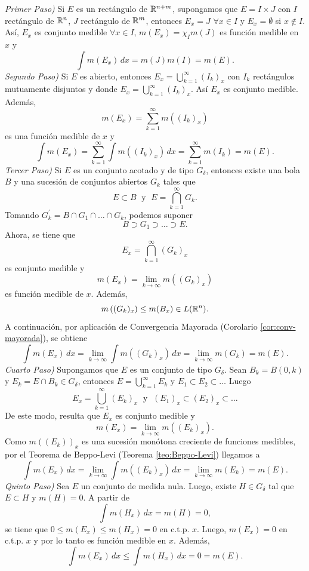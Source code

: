         \begin{demo}
        \emph{Primer Paso)} Si $E$ es un rectángulo de $\mathbb{R}^{n+m}$, supongamos que $E=I\times J$ con $I$ rectángulo de $\mathbb{R}^n$, $J$ rectángulo de $\mathbb{R}^m$, entonces $E_x=J$ $\forall x \in I$ y $E_x=\emptyset$ si $x \notin I$.
        As\'i, $E_x$ es conjunto medible $\forall x \in I$, $m(E_x)=\chi_I m(J)$ es funci\'on medible  en $x$ y 
        \[
        \int m(E_x)\,dx=m(J)m(I)=m(E).
        \]
        \emph{Segundo Paso)} Si $E$ es abierto, entonces $E_x=\bigcup\limits_{k=1}^{\infty} (I_k)_x$ con $I_k$ rectángulos mutuamente disjuntos y donde $E_x=\bigcup\limits_{k=1}^{\infty} \left(I_k\right)_x$. 
        As\'i $E_x$ es conjunto medible. Adem\'as, 
        \[
        m(E_x)=\sum\limits_{k=1}^{\infty} m\left((I_k)_x\right)
        \]
        es una funci\'on medible de $x$ y 
        \[
        \int m(E_x)=\sum\limits_{k=1}^{\infty} \int m\left((I_k)_x\right)\,dx=
        \sum\limits_{k=1}^{\infty} m(I_k)=m(E).
        \]
        \emph{Tercer Paso)} Si $E$ es un conjunto acotado y de tipo $G_{\delta}$, entonces existe una bola $B$ y una sucesi\'on de conjuntos abiertos $G_k$ tales que 
        \[
        E\subset B\;\mbox{  y   }\;E=\bigcap\limits_{k=1}^{\infty}G_k.
        \]
        Tomando $G_k^{'}=B\cap G_1\cap \ldots \cap G_k$, podemos suponer
        \[B\supset G_1 \supset \ldots \supset E.\]
        Ahora, se tiene que 
        \[
        E_x=\bigcap\limits_{k=1}^{\infty} \left(G_k\right)_x
        \]
        es conjunto medible y 
        \[
        m(E_x)=\lim\limits_{k \to \infty} m\left((G_k)_x\right)
        \]
        es funci\'on medible de $x$. Adem\'as, 
        \[
        m\left((G_k)_x\right)\leq m(B_x)\in L(\mathbb{R}^n).
        \]
        A continuaci\'on, por aplicaci\'on de Convergencia Mayorada (Corolario \ref{cor:conv-mayorada}), se obtiene 
        \[
        \int m(E_x)\,dx =\lim\limits_{k \to \infty} \int m\left((G_k)_x\right)\,dx =\lim\limits_{k \to \infty} m(G_k)=m(E).
        \]
        \emph{Cuarto Paso)}
        Supongamos que  $E$ es un conjunto de tipo $G_{\delta}$. 
        Sean $B_k=B(0,k)$ y $E_k=E\cap B_k \in G_{\delta}$, entonces $E=\bigcup\limits_{k=1}^{\infty} E_k$ y $E_1\subset E_2\subset \ldots$ Luego
        \[
        E_x=\bigcup\limits_{k=1}^{\infty} \left(E_k\right)_x
        \;\mbox{ y }\;
        (E_1)_x \subset (E_2)_x \subset \ldots
        \]
        De este modo, resulta que $E_x$ es conjunto medible y 
        \[m(E_x) = \lim\limits_{k \to \infty} m((E_k)_x).\]
                Como $m((E_k))_x$ es una sucesi\'on mon\'otona creciente de funciones medibles, por el Teorema de Beppo-Levi (Teorema \ref{teo:Beppo-Levi}) llegamos a 
     \[\int m(E_x)\,dx=\lim\limits_{k \to \infty} \int m\left(\left(E_k\right)_x\right)\,dx=
     \lim\limits_{k \to \infty} m(E_k)=m(E).
                    \]
    \emph{Quinto Paso)} Sea $E$ un conjunto de medida nula. Luego, existe $H\in G_{\delta}$ tal que $E\subset H$ y $m(H)=0$.
    A partir de 
    \[
    \int m(H_x)\,dx=m(H)=0,
    \]
    se tiene que $0\leq m(E_x)\leq m(H_x)=0$ en c.t.p. $x$. Luego, $m(E_x)=0$
    en c.t.p. $x$ y por lo tanto es funci\'on medible en $x$.
    Adem\'as, 
    \[
    \int m(E_x)\,dx \leq \int m(H_x)\,dx=0=m(E).\]


\end{demo}

